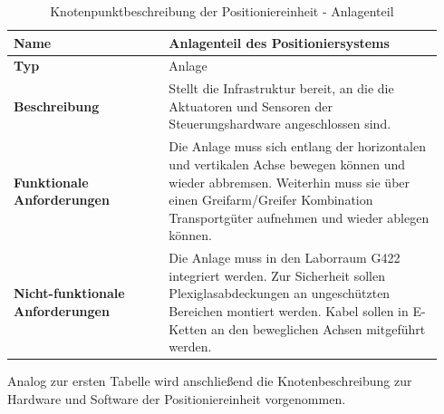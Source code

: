 \documentclass[../../../Bachelorarbeit.tex]{subfiles}
\begin{document}
\begin{table}[H]
    \centering
    \begin{tabular}{| p{0.34\linewidth} | p{0.6\linewidth} |}
        \hline
        \textbf{Name} & Anlagenteil des Positioniersystems \\ \hline
        \textbf{Typ} & Anlage \\ \hline
        \textbf{Beschreibung} & Stellt die Infrastruktur bereit, an die die Aktuatoren und Sensoren der Steuerungshardware angeschlossen sind. \\ \hline
        \textbf{Funktionale Anforderungen} & Die Anlage muss sich entlang der horizontalen und vertikalen Achse bewegen können und wieder abbremsen. Weiterhin muss sie über einen Greifarm/Greifer Kombination Transportgüter aufnehmen und wieder ablegen können. \\ \hline
        \textbf{Nicht-funktionale Anforderungen} & Die Anlage muss in den Laborraum G422 integriert werden. Zur Sicherheit sollen Plexiglasabdeckungen an ungeschützten Bereichen montiert werden. Kabel sollen in E-Ketten an den beweglichen Achsen mitgeführt werden. \\ \hline
    \end{tabular}
    \caption[Knotenpunktbeschreibung - Anlagenteil]{Knotenpunktbeschreibung der Positioniereinheit - Anlagenteil}
    \label{tab:my-table50}
\end{table}

Analog zur ersten Tabelle wird anschließend die Knotenbeschreibung zur Hardware und Software der Positioniereinheit vorgenommen.
\end{document}
